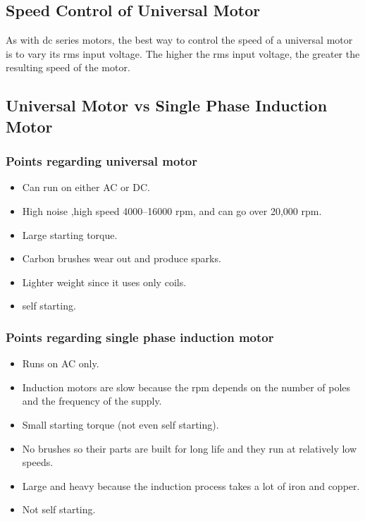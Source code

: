 \documentclass[journal]{IEEEtran}
\begin{document}
\subsection{Speed Control of Universal Motor}
As with dc series motors, the best way to control the speed of a universal motor is 
to vary its rms input voltage. The higher the rms input voltage, the greater the resulting speed of the motor. \cite{chapman2005}



\subsection{Universal Motor vs Single Phase Induction Motor}

\subsubsection{Points regarding universal motor}
\begin{itemize}
    \item Can run on either AC or DC.
    \item High noise ,high speed 4000–16000 rpm, and can go over 20,000 rpm.
    \item Large starting torque.
    \item Carbon brushes  wear out and produce sparks.
    \item Lighter weight since it uses only coils.
    \item  self starting.
\end{itemize}

\subsubsection{Points regarding single phase induction motor}
\begin{itemize}
    \item Runs on AC only.
    \item Induction motors are slow because the rpm depends on the number of poles and the frequency of the supply.
    \item Small starting torque (not even self starting).
    \item No brushes so their parts are built for long life and they run at relatively low speeds.
    \item Large and heavy because the induction process takes a lot of iron and copper.
    \item Not self starting.
\end{itemize}
\end{document}
